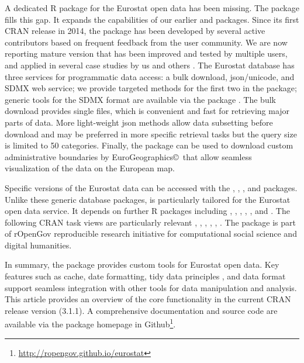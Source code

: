 A dedicated R package for the Eurostat open data has been missing. The  package fills this gap. It expands the capabilities of our earlier  \citep{statfi} and  \citep{smarterpoland} packages. Since its first CRAN release in 2014, the  package has been developed by several active contributors based on frequent feedback from the user community. We are now reporting mature version that has been improved and tested by multiple users, and applied in several case studies by us and others \citep{Kenett2016}. The Eurostat database has three services for programmatic data access: a bulk download, json/unicode, and SDMX web service; we provide targeted methods for the first two in the  package; generic tools for the SDMX format are available via the  package \citep{rsdmx}. The bulk download provides single files, which is convenient and fast for retrieving major parts of data. More light-weight json methods allow data subsetting before download and may be preferred in more specific retrieval tasks but the query size is limited to 50 categories. Finally, the package can be used to download custom administrative boundaries by EuroGeographics\copyright \ that allow seamless visualization of the data on the European map.

Specific versions of the Eurostat data can be accessed with the  \citep{datamart},  \citep{quandl},  \citep{pdfetch}, and  packages. Unlike these generic database packages,  is particularly tailored for the Eurostat open data service. It depends on further R packages including
 \citep{classInt},
 \citep{httr},
 \citep{jsonlite},
 \citep{readr},
 \citep{sp}, and
 \citep{stringi}. The following CRAN task views are particularly relevant , , , , , . The package is part of rOpenGov \citep{Lahti13icml} reproducible research initiative for computational social science and digital humanities. 

 

In summary, the  package provides custom tools for Eurostat open data. Key features such as cache, date formatting, tidy data principles \citep{wickham2014}, and  \citep{tibble} data format support seamless integration with other tools for data manipulation and analysis. This article provides an overview of the core functionality in the current CRAN release version (3.1.1). A comprehensive documentation and source code are available via the package homepage in Github\footnote{\url{http://ropengov.github.io/eurostat}}.


